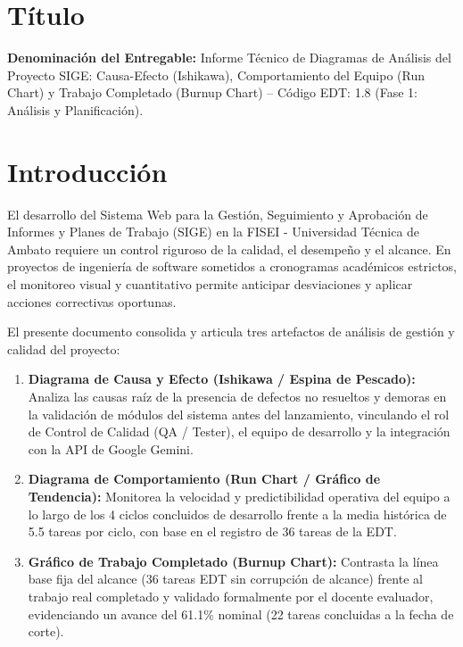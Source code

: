 \documentclass[12pt,a4paper]{article}
\begin{document}

\vspace{0.25cm}

\section{Título}
\textbf{Denominación del Entregable:} Informe Técnico de Diagramas de Análisis del Proyecto SIGE: Causa-Efecto (Ishikawa), Comportamiento del Equipo (Run Chart) y Trabajo Completado (Burnup Chart) -- Código EDT: 1.8 (Fase 1: Análisis y Planificación).

\section{Introducción}
El desarrollo del Sistema Web para la Gestión, Seguimiento y Aprobación de Informes y Planes de Trabajo (SIGE) en la FISEI - Universidad Técnica de Ambato requiere un control riguroso de la calidad, el desempeño y el alcance. En proyectos de ingeniería de software sometidos a cronogramas académicos estrictos, el monitoreo visual y cuantitativo permite anticipar desviaciones y aplicar acciones correctivas oportunas.

El presente documento consolida y articula tres artefactos de análisis de gestión y calidad del proyecto:
\begin{enumerate}[leftmargin=1.5em, itemsep=1.5pt]
    \item \textbf{Diagrama de Causa y Efecto (Ishikawa / Espina de Pescado):} Analiza las causas raíz de la presencia de defectos no resueltos y demoras en la validación de módulos del sistema antes del lanzamiento, vinculando el rol de Control de Calidad (QA / Tester), el equipo de desarrollo y la integración con la API de Google Gemini.
    \item \textbf{Diagrama de Comportamiento (Run Chart / Gráfico de Tendencia):} Monitorea la velocidad y predictibilidad operativa del equipo a lo largo de los 4 ciclos concluidos de desarrollo frente a la media histórica de 5.5 tareas por ciclo, con base en el registro de 36 tareas de la EDT.
    \item \textbf{Gráfico de Trabajo Completado (Burnup Chart):} Contrasta la línea base fija del alcance (36 tareas EDT sin corrupción de alcance) frente al trabajo real completado y validado formalmente por el docente evaluador, evidenciando un avance del 61.1\% nominal (22 tareas concluidas a la fecha de corte).
\end{enumerate}
\end{document}
